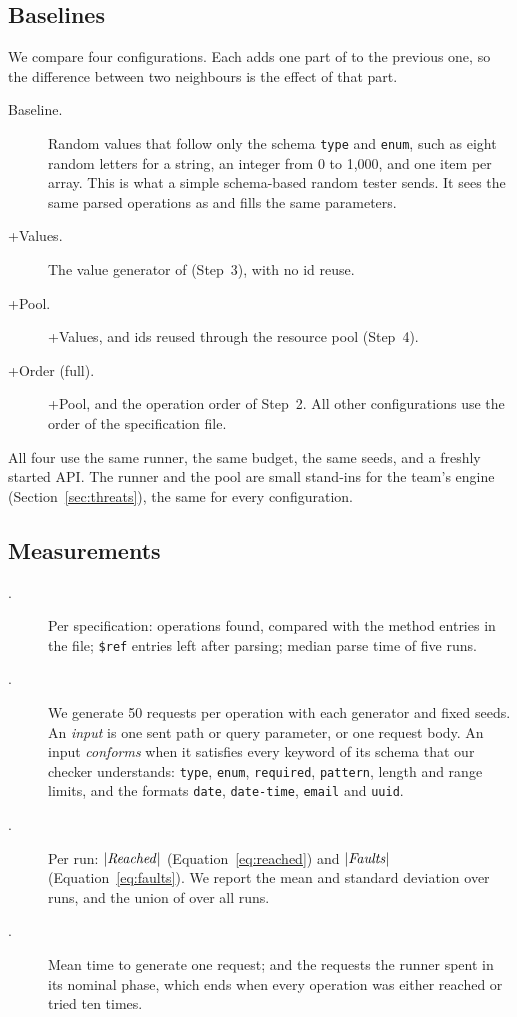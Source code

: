 \subsection{Baselines}
\label{sec:baselines}
We compare four configurations. Each adds one part of \tool to the previous
one, so the difference between two neighbours is the effect of that part.
\begin{description}
  \item[Baseline.] Random values that follow only the schema \texttt{type}
    and \texttt{enum}, such as eight random letters for a string, an integer
    from 0 to 1{,}000, and one item per array. This is what a simple
    schema-based random tester sends. It sees the same parsed operations as
    \tool and fills the same parameters.
  \item[+Values.] The value generator of \tool (Step~3), with no id reuse.
  \item[+Pool.] +Values, and ids reused through the resource pool (Step~4).
  \item[+Order (full).] +Pool, and the operation order of Step~2. All other
    configurations use the order of the specification file.
\end{description}
All four use the same runner, the same budget, the same seeds, and a freshly
started API. The runner and the pool are small stand-ins for the team's
engine (Section~\ref{sec:threats}), the same for every configuration.

\subsection{Measurements}
\begin{description}
  \item[.] Per specification: operations found, compared with the
    method entries in the file; \texttt{\$ref} entries left after parsing;
    median parse time of five runs.
  \item[.] We generate 50  requests per operation with
    each generator and fixed seeds. An \emph{input} is one sent path or query
    parameter, or one request body. An input \emph{conforms} when it
    satisfies every keyword of its schema that our checker understands:
    \texttt{type}, \texttt{enum}, \texttt{required}, \texttt{pattern},
    length and range limits, and the formats \texttt{date},
    \texttt{date-time}, \texttt{email} and \texttt{uuid}.
  \item[.] Per run: $|\mathit{Reached}|$ (Equation~\ref{eq:reached}) and
    $|\mathit{Faults}|$ (Equation~\ref{eq:faults}). We report the mean and standard
    deviation over \NReps runs, and the union of \Faults over all runs.
  \item[.] Mean time to generate one request; and the requests the
    runner spent in its nominal phase, which ends when every operation was
    either reached or tried ten times.
\end{description}

